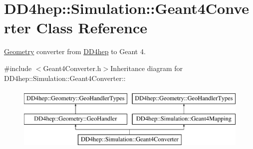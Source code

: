 \hypertarget{class_d_d4hep_1_1_simulation_1_1_geant4_converter}{
\section{DD4hep::Simulation::Geant4Converter Class Reference}
\label{class_d_d4hep_1_1_simulation_1_1_geant4_converter}
}


\hyperlink{namespace_d_d4hep_1_1_geometry}{Geometry} converter from \hyperlink{namespace_d_d4hep}{DD4hep} to Geant 4.  


{\ttfamily \#include $<$Geant4Converter.h$>$}Inheritance diagram for DD4hep::Simulation::Geant4Converter::\begin{figure}[H]
\begin{center}
\leavevmode
\includegraphics[height=3cm]{class_d_d4hep_1_1_simulation_1_1_geant4_converter}
\end{center}
\end{figure}
